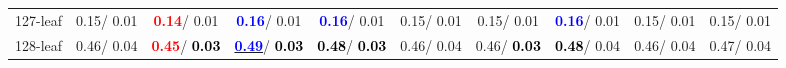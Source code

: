 \begin{table}[h]
\begin{center}
{\begin{tabular}{lc|c|c|c|c|c|c|c|c}
127-leaf &   0.15/  0.01 & \textcolor{red}{\textbf{  0.14}}/  0.01 & \textcolor{blue}{\textbf{  0.16}}/  0.01 & \textcolor{blue}{\textbf{  0.16}}/  0.01 &   0.15/  0.01 &   0.15/  0.01 & \textcolor{blue}{\textbf{  0.16}}/  0.01 &   0.15/  0.01 &   0.15/  0.01 \\
128-leaf &   0.46/  0.04 & \textcolor{red}{\textbf{  0.45}}/\textcolor{black}{\textbf{  0.03}} & \underline{\textcolor{blue}{\textbf{  0.49}}}/\textcolor{black}{\textbf{  0.03}} & \textcolor{black}{\textbf{  0.48}}/\textcolor{black}{\textbf{  0.03}} &   0.46/  0.04 &   0.46/\textcolor{black}{\textbf{  0.03}} & \textcolor{black}{\textbf{  0.48}}/  0.04 &   0.46/  0.04 &   0.47/  0.04 \\\end{tabular}}\label{stratsALCKappa3AllReduxalla}
\end{center}
\end{table}
